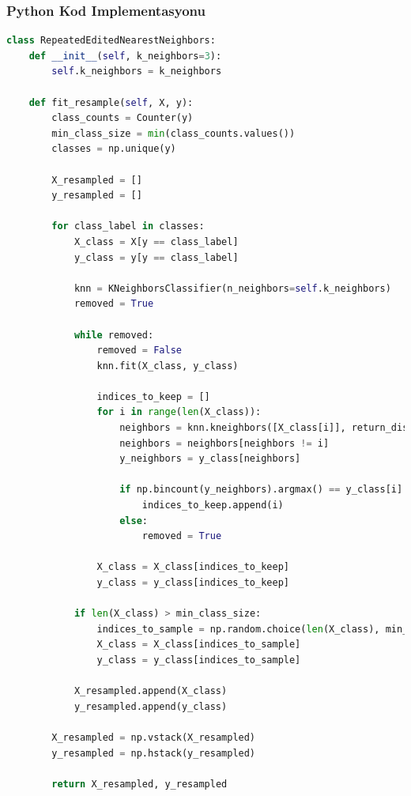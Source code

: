 \subsubsection{Python Kod Implementasyonu}

\begin{lstlisting}[language=Python]
class RepeatedEditedNearestNeighbors:
    def __init__(self, k_neighbors=3):
        self.k_neighbors = k_neighbors

    def fit_resample(self, X, y):
        class_counts = Counter(y)
        min_class_size = min(class_counts.values())
        classes = np.unique(y)

        X_resampled = []
        y_resampled = []

        for class_label in classes:
            X_class = X[y == class_label]
            y_class = y[y == class_label]

            knn = KNeighborsClassifier(n_neighbors=self.k_neighbors)
            removed = True

            while removed:
                removed = False
                knn.fit(X_class, y_class)

                indices_to_keep = []
                for i in range(len(X_class)):
                    neighbors = knn.kneighbors([X_class[i]], return_distance=False)[0]
                    neighbors = neighbors[neighbors != i]
                    y_neighbors = y_class[neighbors]

                    if np.bincount(y_neighbors).argmax() == y_class[i]:
                        indices_to_keep.append(i)
                    else:
                        removed = True
                        
                X_class = X_class[indices_to_keep]
                y_class = y_class[indices_to_keep]

            if len(X_class) > min_class_size:
                indices_to_sample = np.random.choice(len(X_class), min_class_size, replace=False)
                X_class = X_class[indices_to_sample]
                y_class = y_class[indices_to_sample]

            X_resampled.append(X_class)
            y_resampled.append(y_class)

        X_resampled = np.vstack(X_resampled)
        y_resampled = np.hstack(y_resampled)

        return X_resampled, y_resampled
\end{lstlisting}

\newpage

